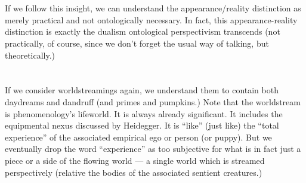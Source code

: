 \documentclass{article}
\newcommand{\q}{\enquote}
\begin{document}
\begin{huge}
{{\section{}
If we follow this insight, we can understand the appearance/reality distinction as merely practical and not ontologically necessary. In fact, this appearance-reality distinction is exactly the dualism ontological perspectivism transcends (not practically, of course, since we don't forget the usual way of talking, but theoretically.)

\section{}
If we consider worldstreamings again, we understand them to contain both daydreams and dandruff (and primes and pumpkins.) Note that the worldstream is phenomenology's lifeworld. It is always already significant. It includes the equipmental nexus discussed by Heidegger. It is \q{like} (just like) the \q{total experience} of the associated empirical ego or person (or puppy). But we eventually drop the word \q{experience} as too subjective for what is in fact just a piece or a side of the flowing world --- a single world which is streamed  perspectively (relative the bodies of the associated sentient creatures.) 


 }}
\end{huge}
\end{document}

